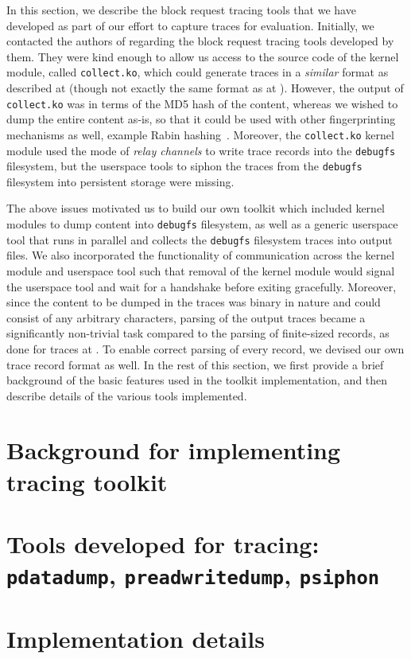 In this section, we describe the block request tracing tools that we have
developed as part of our effort to capture traces for evaluation.
Initially, we contacted the authors of \cite{iodedup} 
regarding the block request tracing tools developed by them. They were
kind enough to allow us access to the source code of the kernel module,
called \texttt{collect.ko},
which could generate traces in a \textit{similar} format as
described at \cite{iodedup-online} (though not exactly the same format
as at \cite{iodedup-online}).
However, the output of \texttt{collect.ko} was in terms of the MD5 hash
of the content, whereas we wished to dump the entire content as-is, 
so that it could be used with other fingerprinting mechanisms as
well, example Rabin hashing~\cite{rabin}.
Moreover, the \texttt{collect.ko} kernel module used the mode of
\textit{relay channels}\cite{relayfs} to write trace records into the 
\texttt{debugfs}\cite{debugfs} filesystem, but the userspace tools to siphon 
the traces from the \texttt{debugfs} filesystem into persistent storage
were missing. 

The above issues motivated us to build our own toolkit which 
included kernel modules to dump content 
into \texttt{debugfs} filesystem, as well as a generic userspace tool
that runs in parallel and collects the \texttt{debugfs} filesystem traces
into output files. We also incorporated the functionality of 
communication across the kernel module and userspace tool such that
removal of the kernel module would signal the userspace tool and wait
for a handshake before exiting gracefully. 
Moreover, since the content to be dumped in the traces was binary in 
nature and could consist of any arbitrary characters, parsing of the
output traces became a significantly non-trivial task compared to the 
parsing of finite-sized records, as done for traces at \cite{iodedup-online}.
To enable correct parsing of every record, we devised our own trace 
record format as well.
In the rest of this section,
we first provide a brief background of the basic features used 
in the toolkit implementation, and then describe details of the
various tools implemented.

\section{Background for implementing tracing toolkit}
\label{sec:tracingchap-background}


\section{Tools developed for tracing: \texttt{pdatadump}, \texttt{preadwritedump}, \texttt{psiphon}}
\label{sec:tracingchap-tools}


\section{Implementation details}
\label{sec:tracingchap-implementation}

